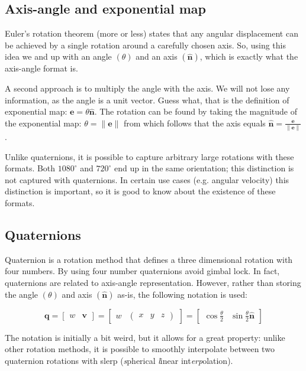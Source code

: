 \documentclass[a4paper,11pt]{article}
\begin{document}
\subsection{Axis-angle and exponential map}

Euler's rotation theorem (more or less) states that any angular displacement can be achieved by a single rotation around a carefully chosen axis. So, using this idea we and up with an angle $(\theta)$ and an axis $(\hat{\textbf{n}})$, which is exactly what the axis-angle format is.

A second approach is to multiply the angle with the axis. We will not lose any information, as the angle is a unit vector. Guess what, that is the definition of exponential map: $\textbf{e}=\theta\hat{\textbf{n}}$. The rotation can be found by taking the magnitude of the exponential map: $\theta=\|\textbf{e}\|$ from which follows that the axis equals $\hat{\textbf{n}}=\frac{\textbf{e}}{\|\textbf{e}\|}$.

Unlike quaternions, it is possible to capture arbitrary large rotations with these formats. Both $1080^\circ$ and $720^\circ$ end up in the same orientation; this distinction is not captured with quaternions. In certain use cases (e.g. angular velocity) this distinction is important, so it is good to know about the existence of these formats.

\subsection{Quaternions}

Quaternion is a rotation method that defines a three dimensional rotation with four numbers. By using four number quaternions avoid gimbal lock. In fact, quaternions are related to axis-angle representation. However, rather than storing the angle $(\theta)$ and axis $(\hat{\textbf{n}})$ as-is, the following notation is used:

$$
\textbf{q}=\begin{bmatrix}
	w & \textbf{v}
\end{bmatrix}=\begin{bmatrix}
	w & \begin{pmatrix}
		x & y & z
	\end{pmatrix}
\end{bmatrix}=\begin{bmatrix}
	\cos\frac{\theta}{2} & \sin\frac{\theta}{2}\hat{\textbf{n}}
\end{bmatrix}
$$

The notation is initially a bit weird, but it allows for a great property: unlike other rotation methods, it is possible to smoothly interpolate between two quaternion rotations with slerp (\textit{s}pherical \textit{l}inear int\textit{erp}olation). 
\end{document}
